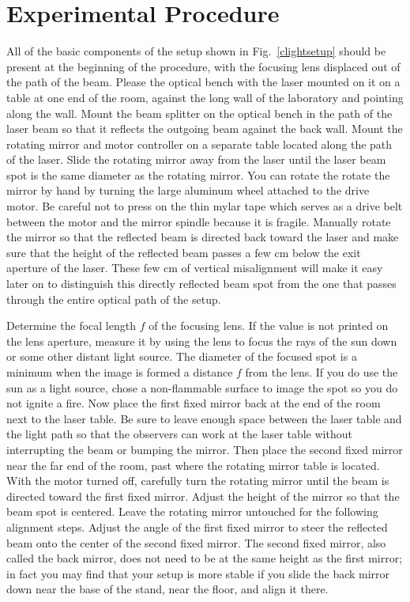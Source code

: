 \documentclass{revtex4}
\begin{document}
\section{Experimental Procedure}

All of the basic components of the setup shown in Fig.~\ref{clightsetup}
should be present at the beginning of the procedure, with the focusing lens
displaced out of the path of the beam.  Please the optical bench with the
laser mounted on it on a table at one end of the room, against the long wall
of the laboratory and pointing along the wall.  Mount the beam splitter on
the optical bench in the path of the laser beam so that it reflects the
outgoing beam against the back wall.  Mount the rotating mirror and motor
controller on a separate table located along the path of the laser.  Slide
the rotating mirror away from the laser until the laser beam spot is the
same diameter as the rotating mirror.  You can rotate the rotate the mirror
by hand by turning the large aluminum wheel attached to the drive motor. 
Be careful not to press on the thin mylar tape which serves as a drive belt
between the motor and the mirror spindle because it is fragile. 
Manually rotate the mirror so that the reflected beam is directed back toward
the laser and make sure that the height of the reflected beam passes a few cm
below the exit aperture of the laser.  These few cm of vertical misalignment
will make it easy later on to distinguish this directly reflected beam spot
from the one that passes through the entire optical path of the setup.

Determine the focal length $f$ of the focusing lens.  If the value is not
printed on the lens aperture, measure it by using the lens to focus the
rays of the sun down or some other distant light source.  The diameter of
the focused spot is a minimum when the image is formed a distance $f$ from
the lens.  If you do use the sun as a light source, chose a non-flammable
surface to image the spot so you do not ignite a fire.  Now place the first
fixed mirror back at the end of the room next to the laser table.  Be sure
to leave enough space between the laser table and the light path so that
the observers can work at the laser table without interrupting the beam or
bumping the mirror.  Then place the second fixed mirror near the far end of
the room, past where the rotating mirror table is located.
With the motor turned off,
carefully turn the rotating mirror until the beam is directed toward the
first fixed mirror.  Adjust the height of the mirror so that the beam spot
is centered.  Leave the rotating mirror untouched for the following alignment
steps.  Adjust the angle of the first fixed mirror to steer the reflected
beam onto the center of the second fixed mirror.  The second fixed mirror,
also called the back mirror, does not need to be at the same height as the
first mirror; in fact you may find that your setup is more stable if you
slide the back mirror down near the base of the stand, near the floor, and
align it there.
\end{document}
